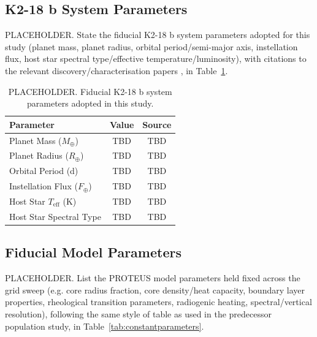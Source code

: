 \documentclass[fleqn,usenatbib]{mnras}
\begin{document}
\subsection{K2-18 b System Parameters}
\label{subsec:k218bparams}

PLACEHOLDER. State the fiducial K2-18 b system parameters adopted for this
study (planet mass, planet radius, orbital period/semi-major axis,
instellation flux, host star spectral type/effective temperature/luminosity),
with citations to the relevant discovery/characterisation papers
\citep{Cloutier2017,Sarkis2018,Benneke2019}, in Table~\ref{tab:k218bparams}.

\begin{table}
\centering
\renewcommand{\arraystretch}{1.2}
\begin{tabular}{lcc}
\hline
Parameter & Value & Source \\
\hline
Planet Mass ($M_{\oplus}$) & TBD & TBD \\
Planet Radius ($R_{\oplus}$) & TBD & TBD \\
Orbital Period (d) & TBD & TBD \\
Instellation Flux ($F_{\oplus}$) & TBD & TBD \\
Host Star $T_{\text{eff}}$ (K) & TBD & TBD \\
Host Star Spectral Type & TBD & TBD \\
\hline
\end{tabular}
\caption{PLACEHOLDER. Fiducial K2-18 b system parameters adopted in this
study.}
\label{tab:k218bparams}
\end{table}

\subsection{Fiducial Model Parameters}
\label{subsec:fiducialparams}

PLACEHOLDER. List the PROTEUS model parameters held fixed across the grid
sweep (e.g. core radius fraction, core density/heat capacity, boundary layer
properties, rheological transition parameters, radiogenic heating,
spectral/vertical resolution), following the same style of table as used in
the predecessor population study, in Table~\ref{tab:constantparameters}.
\end{document}
